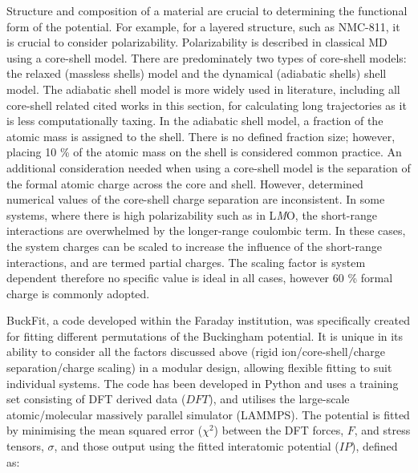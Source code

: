 \documentclass[../main.tex]{subfiles}
\begin{document}
Structure and composition of a material are crucial to determining the functional form of the potential. For example, for a layered structure, such as NMC-811, it is crucial to consider polarizability. Polarizability is described in classical MD using a core-shell model. There are predominately two types of core-shell models: the relaxed (massless shells) model \cite{Lindan_1993} and the dynamical (adiabatic shells) shell model. \cite{Mitchell_1993} The adiabatic shell model is more widely used in literature, including all core-shell related cited works in this section,\cite{Hart1998, Fisher2010, Lewis_1985,Ammundsen1999, Kerisit2014, he2019thermal,lee2012atomistic} for calculating long trajectories as it is less computationally taxing. In the adiabatic shell model, a fraction of the atomic mass is assigned to the shell. There is no defined fraction size; however, placing 10 \% of the atomic mass on the shell is considered common practice. \cite{PLIMPTON19951,todorov2006dl_poly_3} An additional consideration needed when using a core-shell model is the separation of the formal atomic charge across the core and shell. However, determined numerical values of the core-shell charge separation are inconsistent. \cite{wang2014molecular,escribano2017enhancing, lee2012atomistic,Lee2013_lithium,dai2019comparison} In some systems, where there is high polarizability such as in L\textit{M}O, the short-range interactions are overwhelmed by the longer-range coulombic term. In these cases, the system charges can be scaled to increase the influence of the short-range interactions, and are termed partial charges. The scaling factor is system dependent therefore no specific value is ideal in all cases, however 60 \% formal charge is commonly adopted. \cite{pedone2006potentials}

BuckFit, \cite{Morgan2020BuckFit} a code developed within the Faraday institution, was specifically created for fitting different permutations of the Buckingham potential. It is unique in its ability to consider all the factors discussed above (rigid ion/core-shell/charge separation/charge scaling) in a modular design, allowing flexible fitting to suit individual systems. The code has been developed in Python and uses a training set consisting of DFT derived data ($DFT$), and utilises the large-scale atomic/molecular massively parallel simulator (LAMMPS). \cite{PLIMPTON19951} The potential is fitted by minimising the mean squared error ($\chi^2$) between the DFT forces, $F$, and stress tensors, $\sigma$,  and those output using the fitted interatomic potential ($IP$), defined as:
\end{document}
